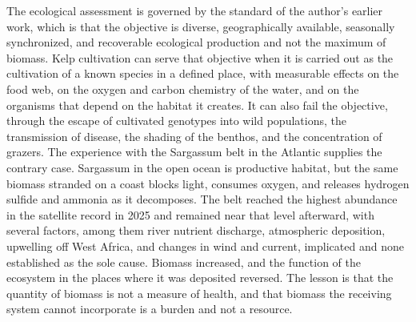 The ecological assessment is governed by the standard of the author's earlier work, which is that the objective is diverse, geographically available, seasonally synchronized, and recoverable ecological production and not the maximum of biomass. Kelp cultivation can serve that objective when it is carried out as the cultivation of a known species in a defined place, with measurable effects on the food web, on the oxygen and carbon chemistry of the water, and on the organisms that depend on the habitat it creates. It can also fail the objective, through the escape of cultivated genotypes into wild populations, the transmission of disease, the shading of the benthos, and the concentration of grazers. The experience with the Sargassum belt in the Atlantic supplies the contrary case. Sargassum in the open ocean is productive habitat, but the same biomass stranded on a coast blocks light, consumes oxygen, and releases hydrogen sulfide and ammonia as it decomposes. The belt reached the highest abundance in the satellite record in 2025 and remained near that level afterward, with several factors, among them river nutrient discharge, atmospheric deposition, upwelling off West Africa, and changes in wind and current, implicated and none established as the sole cause. Biomass increased, and the function of the ecosystem in the places where it was deposited reversed. The lesson is that the quantity of biomass is not a measure of health, and that biomass the receiving system cannot incorporate is a burden and not a resource.

